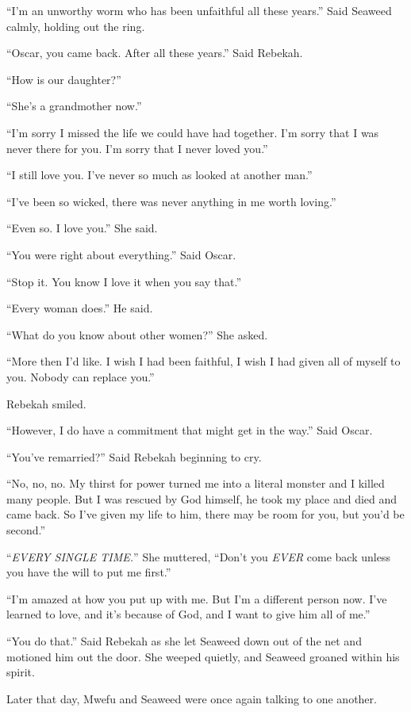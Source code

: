 ``I'm an unworthy worm who has been unfaithful all these years.'' Said Seaweed calmly, holding out the ring.

``Oscar, you came back. After all these years.'' Said Rebekah.

``How is our daughter?''

``She's a grandmother now.''

``I'm sorry I missed the life we could have had together. I'm sorry that I was never there for you. I'm sorry that I never loved you.''

``I still love you. I've never so much as looked at another man.''

``I've been so wicked, there was never anything in me worth loving.''

``Even so. I love you.'' She said.

``You were right about everything.'' Said Oscar.

``Stop it. You know I love it when you say that.''

``Every woman does.'' He said.

``What do you know about other women?'' She asked.

``More then I'd like. I wish I had been faithful, I wish I had given all of myself to you. Nobody can replace you.''

Rebekah smiled.

``However, I do have a commitment that might get in the way.'' Said Oscar.

``You've remarried?'' Said Rebekah beginning to cry.

``No, no, no. My thirst for power turned me into a literal monster and I killed many people. But I was rescued by God himself, he took my place and died and came back. So I've given my life to him, there may be room for you, but you'd be second.''

``\emph{EVERY SINGLE TIME.}'' She muttered, ``Don't you \emph{EVER} come back unless you have the will to put me first.''

``I'm amazed at how you put up with me. But I'm a different person now. I've learned to love, and it's because of God, and I want to give him all of me.''

``You do that.'' Said Rebekah as she let Seaweed down out of the net and motioned him out the door. She weeped quietly, and Seaweed groaned within his spirit.

\tbreak

Later that day, Mwefu and Seaweed were once again talking to one another.

